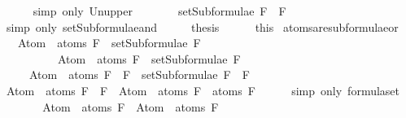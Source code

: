 \begin{isabellebody}
\ \ \ \ \isamarkupfalse%
\ {\isacharparenleft}simp\ only{\isacharcolon}\ Un{\isacharunderscore}upper{}{\isacharparenright}\isanewline
\ \ \isamarkupfalse%
\ \isamarkupfalse%
\ {\isachardoublequoteopen}{\isasymdots}\ {\isacharequal}\ setSubformulae\ {\isacharparenleft}F{}\ \isactrlbold {\isasymand}\ F{}{\isacharparenright}{\isachardoublequoteclose}\isanewline
\ \ \ \ \isamarkupfalse%
\ {\isacharparenleft}simp\ only{\isacharcolon}\ setSubformulae{\isacharunderscore}and{\isacharparenright}\isanewline
\ \ \isamarkupfalse%
\ \isamarkupfalse%
\ {\isacharquery}thesis\isanewline
\ \ \ \ \isamarkupfalse%
\ this\isanewline
{}\isamarkupfalse%
%
\endisatagproof
{\isafoldproof}%
%
\isadelimproof
\isanewline
%
\endisadelimproof
\isanewline
{}\isamarkupfalse%
\ atoms{\isacharunderscore}are{\isacharunderscore}subformulae{\isacharunderscore}or{\isacharcolon}\ \isanewline
\ \ \ {\isachardoublequoteopen}Atom\ {\isacharbackquote}\ atoms\ F{}\ {\isasymsubseteq}\ setSubformulae\ F{}{\isachardoublequoteclose}\isanewline
\ \ \ \ \ \ \ \ \ \ {\isachardoublequoteopen}Atom\ {\isacharbackquote}\ atoms\ F{}\ {\isasymsubseteq}\ setSubformulae\ F{}{\isachardoublequoteclose}\isanewline
\ \ \ \ \ {\isachardoublequoteopen}Atom\ {\isacharbackquote}\ atoms\ {\isacharparenleft}F{}\ \isactrlbold {\isasymor}\ F{}{\isacharparenright}\ {\isasymsubseteq}\ setSubformulae\ {\isacharparenleft}F{}\ \isactrlbold {\isasymor}\ F{}{\isacharparenright}{\isachardoublequoteclose}\isanewline
%
\isadelimproof
%
\endisadelimproof
%
\isatagproof
{}\isamarkupfalse%
\ {\isacharminus}\isanewline
\ \ \isamarkupfalse%
\ {\isachardoublequoteopen}Atom\ {\isacharbackquote}\ atoms\ {\isacharparenleft}F{}\ \isactrlbold {\isasymor}\ F{}{\isacharparenright}\ {\isacharequal}\ Atom\ {\isacharbackquote}\ {\isacharparenleft}atoms\ F{}\ {\isasymunion}\ atoms\ F{}{\isacharparenright}{\isachardoublequoteclose}\isanewline
\ \ \ \ \isamarkupfalse%
\ {\isacharparenleft}simp\ only{\isacharcolon}\ formula{\isachardot}set{\isacharparenleft}{}{\isacharparenright}{\isacharparenright}\isanewline
\ \ \isamarkupfalse%
\ \isamarkupfalse%
\ {\isachardoublequoteopen}{\isasymdots}\ {\isacharequal}\ Atom\ {\isacharbackquote}\ atoms\ F{}\ {\isasymunion}\ Atom\ {\isacharbackquote}\ atoms\ F{}{\isachardoublequoteclose}\ \isanewline

\end{isabellebody}
